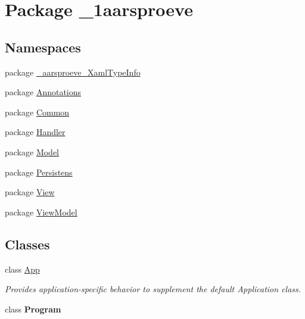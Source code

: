 \hypertarget{namespace__1aarsproeve}{}\section{Package \+\_\+1aarsproeve}
\label{namespace__1aarsproeve}
\subsection*{Namespaces}
\begin{DoxyCompactItemize}
\item 
package \hyperlink{namespace__1aarsproeve_1_1__aarsproeve___xaml_type_info}{\+\_\+aarsproeve\+\_\+\+Xaml\+Type\+Info}
\item 
package \hyperlink{namespace__1aarsproeve_1_1_annotations}{Annotations}
\item 
package \hyperlink{namespace__1aarsproeve_1_1_common}{Common}
\item 
package \hyperlink{namespace__1aarsproeve_1_1_handler}{Handler}
\item 
package \hyperlink{namespace__1aarsproeve_1_1_model}{Model}
\item 
package \hyperlink{namespace__1aarsproeve_1_1_persistens}{Persistens}
\item 
package \hyperlink{namespace__1aarsproeve_1_1_view}{View}
\item 
package \hyperlink{namespace__1aarsproeve_1_1_view_model}{View\+Model}
\end{DoxyCompactItemize}
\subsection*{Classes}
\begin{DoxyCompactItemize}
\item 
class \hyperlink{class__1aarsproeve_1_1_app}{App}
\begin{DoxyCompactList}\small\item\em Provides application-\/specific behavior to supplement the default Application class. \end{DoxyCompactList}\item 
class {\bfseries Program}
\end{DoxyCompactItemize}
